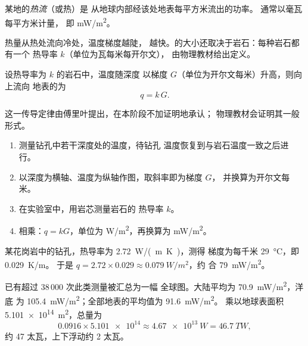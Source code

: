 \begin{definition}[热流]\label{def:g12:internal-heat:heat-flow}
某地的\emph{热流}（或热）是
从地球内部经该处地表每平方米流出的功率。
通常以毫瓦每平方米计量，
即 \unit{mW/m^2}。
\end{definition}

热量从热处流向冷处，温度梯度越陡，
越快。的大小还取决于岩石：每种岩石都有一个
热导率 $k$（单位为瓦每米每开尔文），
由物理教材给出定义。

\begin{proposition}[热流与梯度]\label{prop:g12:internal-heat:fourier}
设热导率为 $k$ 的岩石中，温度随深度
以梯度 $G$（单位为开尔文每米）升高，则向上流向
地表的为
\[
  q = k\,G .
\]
\end{proposition}

这一传导定律由傅里叶提出，在本阶段不加证明地承认；
物理教材会证明其一般形式。

\begin{method}[由钻孔测定热流]\label{met:g12:internal-heat:borehole}
\begin{enumerate}
  \item 测量钻孔中若干深度处的温度，待钻孔
        温度恢复到与岩石温度一致之后进行。
  \item 以深度为横轴、温度为纵轴作图，取斜率即为梯度 $G$，
        并换算为开尔文每米。
  \item 在实验室中，用岩芯测量岩石的
        热导率 $k$。
  \item 相乘：$q = kG$，单位为 \unit{W/m^2}，再换算为 \unit{mW/m^2}。
\end{enumerate}
\end{method}

\begin{example}[花岗岩中的钻孔]\label{ex:g12:internal-heat:borehole}
某花岗岩中的钻孔，热导率为 \qty{2.72}{W/(m.K)}，测得
梯度为每千米 \qty{29}{\celsius}，即 \qty{0.029}{K/m}。
于是 $q = 2.72 \times 0.029 \approx \qty{0.079}{W/m^2}$，约
合 \qty{79}{mW/m^2}。
\end{example}

已有超过 38\,000 次此类测量被汇总为一幅
全球图。大陆平均为 \qty{70.9}{mW/m^2}，洋底
为 \qty{105.4}{mW/m^2}；全部地表的平均值为 \qty{91.6}{mW/m^2}。
乘以地球表面积 \qty{5.101e14}{m^2}，总量为
\[
  0.0916 \times \num{5.101e14} \approx \qty{4.67e13}{W} = \qty{46.7}{TW},
\]
约 47 太瓦，上下浮动约 2 太瓦。

